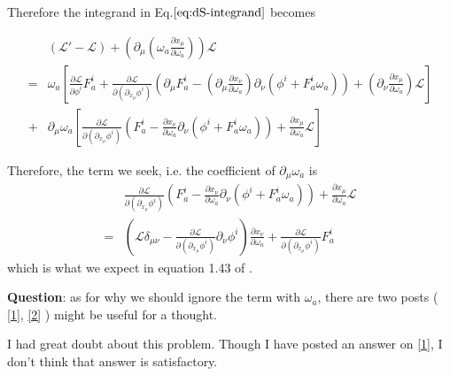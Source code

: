 \documentclass{article}
\begin{document}
Therefore the integrand in Eq.$\ref{eq:dS-integrand}$ becomes

\begin{align}
    & (\mathcal{L}'-\mathcal{L})
    +
    \left(\partial_\mu(\omega_a\frac{\partial x_\mu}{\partial \omega_a})\right)
    \mathcal{L} \\
    = & 
    \omega_a
    \left[
        \frac{\partial \mathcal{L}}{\partial\phi^i}F^i_a 
        +
        \frac{\partial \mathcal{L}}{\partial(\partial_{x_\mu}\phi^i)}
        \left(
            \partial_\mu F^i_a 
            - (\partial_\mu\frac{\partial x_\nu}{\partial \omega_a})
            \partial_\nu(\phi^i+F^i_a\omega_a)
        \right)
        +
        (\partial_\nu \frac{\partial x_\mu}{\partial \omega_a})\mathcal{L}
    \right]
    \\
    +&
    \partial_\mu\omega_a
    \left[
        \frac{\partial \mathcal{L}}{\partial(\partial_{x_\mu}\phi^i)}
        \left(
            F^i_a-\frac{\partial x_\nu}{\partial \omega_a}
            \partial_\nu(\phi^i+F^i_a\omega_a)
        \right)
        +
        \frac{\partial x_\mu}{\partial \omega_a}\mathcal{L}
    \right]
\end{align}

Therefore, the term we seek, i.e. the coefficient of $\partial_\mu\omega_a$ is
\begin{align}
  & \frac{\partial \mathcal{L}}{\partial(\partial_{x_\mu}\phi^i)}
    \left(
        F^i_a-\frac{\partial x_\nu}{\partial \omega_a}
        \partial_\nu(\phi^i+F^i_a\omega_a)
    \right)
    +
    \frac{\partial x_\mu}{\partial \omega_a}\mathcal{L} \\
    =&
    \left(
        \mathcal{L}\delta_{\mu\nu}
        -\frac{\partial \mathcal{L}}{\partial(\partial_{x_\mu}\phi^i)}
            \partial_\nu \phi^i
    \right) \frac{\partial x_\nu}{\partial \omega_a}
    +
    \frac{\partial \mathcal{L}}{\partial(\partial_{x_\mu}\phi^i)}F^i_a
\end{align}
which is what we expect in equation 1.43 of \cite{Altland2010}.

\textbf{Question}: as for why we should ignore the term with $\omega_a$, there
are two posts (
    \href{http://physics.stackexchange.com/questions/122965/derivation-of-the-noether-current}{[1]},
    \href{http://physics.stackexchange.com/questions/99853/on-a-trick-to-derive-the-noether-current}{[2]} )
might be useful for a thought.


I had great doubt about this problem. Though I have posted an answer on
\href{http://physics.stackexchange.com/questions/122965/derivation-of-the-noether-current}{[1]},
I don't think that answer is satisfactory.
\end{document}

